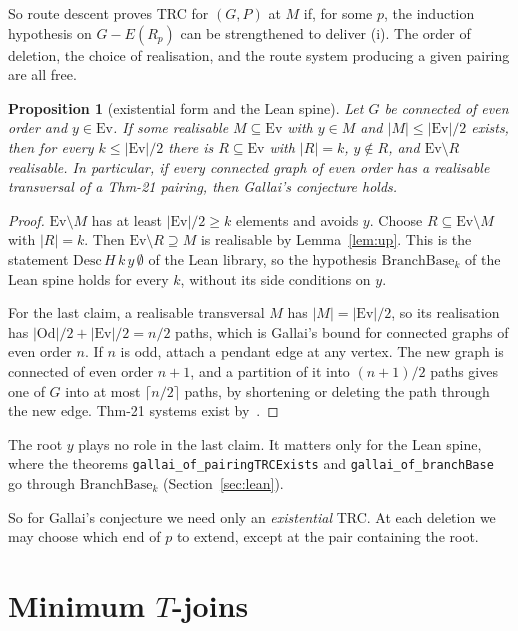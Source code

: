 \documentclass[11pt]{amsart}
\newtheorem{proposition}[theorem]{Proposition}
\theoremstyle{definition}
\newcommand{\Ev}{\mathrm{Ev}}
\newcommand{\Od}{\mathrm{Od}}
\begin{document}
So route descent proves TRC for $(G,P)$ at $M$ if, for some $p$, the induction hypothesis on
$G-E(R_p)$ can be strengthened to deliver (i). The order of deletion, the choice of realisation, and
the route system producing a given pairing are all free.

\begin{proposition}[existential form and the Lean spine]\label{prop:spine}
Let $G$ be connected of even order and $y\in\Ev$. If some realisable $M\subseteq\Ev$ with $y\in M$ and
$|M|\le|\Ev|/2$ exists, then for every $k\le|\Ev|/2$ there is $R\subseteq\Ev$ with $|R|=k$, $y\notin R$,
and $\Ev\setminus R$ realisable. In particular, if every connected graph of even order has a
realisable transversal of a Thm-21 pairing, then Gallai's conjecture holds.
\end{proposition}

\begin{proof}
$\Ev\setminus M$ has at least $|\Ev|/2\ge k$ elements and avoids $y$. Choose $R\subseteq\Ev\setminus M$
with $|R|=k$. Then $\Ev\setminus R\supseteq M$ is realisable by Lemma~\ref{lem:up}. This is the statement
$\mathrm{Desc}\,H\,k\,y\,\emptyset$ of the Lean library, so the hypothesis $\mathrm{BranchBase}_k$ of the
Lean spine holds for every $k$, without its side conditions on $y$.

For the last claim, a realisable transversal $M$ has $|M|=|\Ev|/2$, so its realisation has
$|\Od|/2+|\Ev|/2=n/2$ paths, which is Gallai's bound for connected graphs of even order $n$. If $n$ is
odd, attach a pendant edge at any vertex. The new graph is connected of even order $n+1$, and a
partition of it into $(n+1)/2$ paths gives one of $G$ into at most $\lceil n/2\rceil$ paths, by shortening
or deleting the path through the new edge. Thm-21 systems exist by~\cite[Theorem~21]{EMM}.
\end{proof}

The root $y$ plays no role in the last claim. It matters only for the Lean spine, where the theorems
\texttt{gallai\_of\_pairingTRCExists} and \texttt{gallai\_of\_branchBase} go through $\mathrm{BranchBase}_k$
(Section~\ref{sec:lean}).

So for Gallai's conjecture we need only an \emph{existential} TRC. At each deletion we may choose
which end of $p$ to extend, except at the pair containing the root.

\section{Minimum $T$-joins}\label{sec:min}
\end{document}
